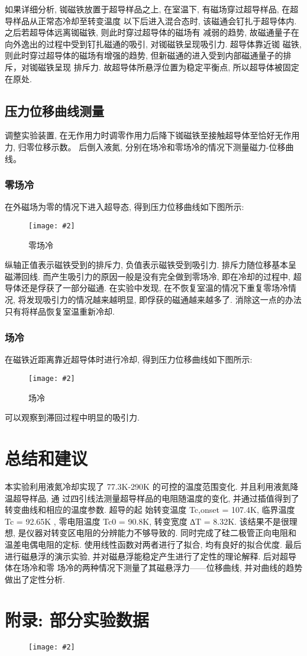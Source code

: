 \documentclass[12pt,a4paper]{article}
\newcommand{\bfig}[3]{
    \begin{figure}[H]
        \centering
        \texttt{[image: \#2]}
        \caption{#3}
    \end{figure}
}
\begin{document}
如果详细分析, 铷磁铁放置于超导样品之上, 在室温下, 有磁场穿过超导样品, 在超导样品从正常态冷却至转变温度
以下后进入混合态时, 该磁通会钉扎于超导体内. 之后若超导体远离铷磁铁, 则此时穿过超导体的磁场有
减弱的趋势, 故磁通量子在向外逸出的过程中受到钉扎磁通的吸引, 对铷磁铁呈现吸引力. 超导体靠近铷
磁铁, 则此时穿过超导体的磁场有增强的趋势, 但新磁通的进入受到内部磁通量子的排斥，对铷磁铁呈现
排斥力. 故超导体所悬浮位置为稳定平衡点, 所以超导体被固定在原处. 
\subsection{压力位移曲线测量}
调整实验装置, 在无作用力时调零作用力后降下铷磁铁至接触超导体至恰好无作用力, 归零位移示数。
后倒入液氮, 分别在场冷和零场冷的情况下测量磁力-位移曲线。
\subsubsection{零场冷}
在外磁场为零的情况下进入超导态, 得到压力位移曲线如下图所示: 
\bfig{0.8}{zfc.png}{零场冷}
纵轴正值表示磁铁受到的排斥力, 负值表示磁铁受到吸引力. 排斥力随位移基本呈磁滞回线. 而产生吸引力的原因一般是没有完全做到零场冷, 即在冷却的过程中, 超导体还是俘获了一部分磁通.  
在实验中发现, 在不恢复室温的情况下重复零场冷情况, 将发现吸引力的情况越来越明显, 即俘获的磁通越来越多了. 消除这一点的办法只有将样品恢复室温重新冷却. 
\subsubsection{场冷}
在磁铁近距离靠近超导体时进行冷却, 得到压力位移曲线如下图所示: 
\bfig{0.8}{fc.png}{场冷}
可以观察到滞回过程中明显的吸引力. 
\section{总结和建议}
本实验利用液氮冷却实现了 77.3K-290K 的可控的温度范围变化. 并且利用液氮降温超导样品, 通
过四引线法测量超导样品的电阻随温度的变化, 并通过插值得到了转变曲线和相应的温度参数. 超导的起
始转变温度 Tc,onset = 107.4K, 临界温度 Tc = 92.65K , 零电阻温度 Tc0 = 90.8K, 转变宽度 ∆T = 8.32K. 该结果不是很理想, 是仪器对转变区电阻的分辨能力不够导致的. 
同时完成了硅二极管正向电阻和温差电偶电阻的定标. 使用线性函数对两者进行了拟合, 均有良好的拟合优度. 
最后进行磁悬浮的演示实验, 并对磁悬浮能稳定产生进行了定性的理论解释. 后对超导体在场冷和零
场冷的两种情况下测量了其磁悬浮力——位移曲线, 并对曲线的趋势做出了定性分析. 

\section{附录: 部分实验数据}
\bfig{0.95}{Data.jpg}{}
\end{document}
